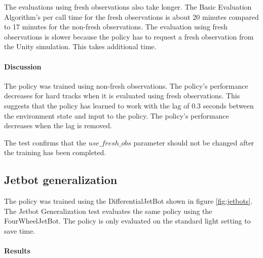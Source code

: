 The evaluations using fresh observations also take longer. The Basic Evaluation Algorithm's per call time for the fresh observations is about 20 minutes compared to 17 minutes for the non-fresh observations. The evaluation using fresh observations is slower because the policy has to request a fresh observation from the Unity simulation. This takes additional time.


\paragraph{Discussion}

The policy was trained using non-fresh observations. The policy's performance decreases for hard tracks when it is evaluated using fresh observations.
This suggests that the policy has learned to work with the lag of 0.3 seconds between the environment state and input to the policy. The policy's performance decreases when the lag is removed.

The test confirms that the $use\_fresh\_obs$ parameter should not be changed after the training has been completed.


\subsection{Jetbot generalization}

The policy was trained using the DifferentialJetBot shown in figure \ref{fig:jetbots}. The Jetbot Generalization test evaluates the same policy using the FourWheelJetBot. The policy is only evaluated on the standard light setting to save time.

\paragraph{Results}

